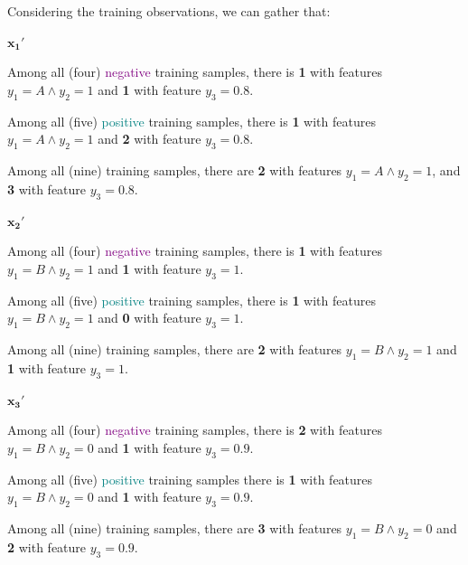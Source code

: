 \documentclass[12pt]{article}
\begin{document}
\begin{enumerate}[leftmargin=\labelsep]
        Considering the training observations, we can gather that:

        \begin{multicols}{3}
          \setlength{\columnseprule}{1pt}
          \def\columnseprulecolor{\color{black}}
          \centering

          $\mathbf{x_1'}$

          Among all (four) \textcolor{purple}{negative} training samples, there is \textbf{1} with features $y_1 = A \wedge y_2 = 1$ and
          \textbf{1} with feature $y_3 = 0.8$.

          Among all (five) \textcolor{teal}{positive} training samples, there is \textbf{1} with features $y_1 = A \wedge y_2 = 1$ and
          \textbf{2} with feature $y_3 = 0.8$.

          Among all (nine) training samples, there are \textbf{2} with features $y_1 = A \wedge y_2 = 1$, and
          \textbf{3} with feature $y_3 = 0.8$.

          \columnbreak

          $\mathbf{x_2'}$

          Among all (four) \textcolor{purple}{negative} training samples, there is \textbf{1} with features $y_1 = B \wedge y_2 = 1$ and
          \textbf{1} with feature $y_3 = 1$.

          Among all (five) \textcolor{teal}{positive} training samples, there is \textbf{1} with features $y_1 = B \wedge y_2 = 1$ and
          \textbf{0} with feature $y_3 = 1$.

          Among all (nine) training samples, there are \textbf{2} with features $y_1 = B \wedge y_2 = 1$ and
          \textbf{1} with feature $y_3 = 1$.

          \columnbreak

          $\mathbf{x_3'}$

          Among all (four) \textcolor{purple}{negative} training samples, there is \textbf{2} with features $y_1 = B \wedge y_2 = 0$ and
          \textbf{1} with feature $y_3 = 0.9$.

          Among all (five) \textcolor{teal}{positive} training samples there is \textbf{1} with features $y_1 = B \wedge y_2 = 0$ and
          \textbf{1} with feature $y_3 = 0.9$.

          Among all (nine) training samples, there are \textbf{3} with features $y_1 = B \wedge y_2 = 0$ and
          \textbf{2} with feature $y_3 = 0.9$.

        \end{multicols}


\end{enumerate}
\end{document}
